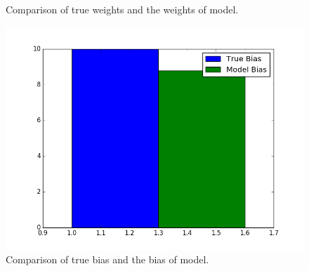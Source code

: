 \documentclass[letter, 12pt]{article}
\begin{document}
\begin{enumerate}
\begin{figure}[H]
\begin{minipage}{.48\textwidth}
    			\caption{Comparison of true weights and the weights of model.}
    			\label{fig:q5-2}
    		\end{minipage}
    		\begin{minipage}{.48\textwidth}
    			\centering
    			\includegraphics[width=\linewidth]{q5-3.png}
    			\caption{Comparison of true bias and the bias of model.}
    			\label{fig:q5-3}
    		\end{minipage}
    	\end{figure}
    \end{enumerate}
\end{document}

